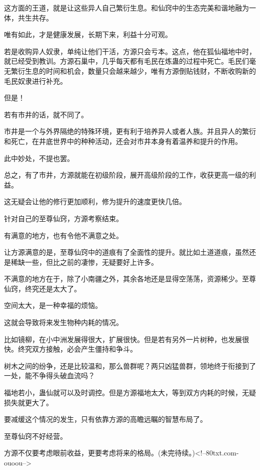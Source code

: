 \begin{this_body}
这方面的王道，就是让这些异人自己繁衍生息。和仙窍中的生态完美和谐地融为一体，共生共存。

唯有如此，才是健康发展，长期下来，利益十分可观。

若是收购异人奴隶，单纯让他们干活，方源只会亏本。这点，他在狐仙福地中时，就已经受到教训。方源石巢中，几乎每天都有毛民在炼蛊的过程中死亡。毛民们毫无繁衍生息的时间和机会，数量只会越来越少，唯有方源倒贴钱财，不断收购新的毛民奴隶进行补充。

但是！

若有市井的话，就不同了。

市井是一个与外界隔绝的特殊环境，更有利于培养异人或者人族。并且异人的繁衍和死亡，在井底世界中的种种活动，还会对市井本身有着温养和提升的作用。

此中妙处，不提也罢。

总之，有了市井，方源就能在初级阶段，展开高级阶段的工作，收获更高一级的利益。

这无疑会让他的修行更加顺利，修为提升的速度更快几倍。

针对自己的至尊仙窍，方源考察结束。

有满意的地方，也有令他不满意之处。

让方源满意的是，至尊仙窍中的道痕有了全面性的提升。就比如土道道痕，虽然还是稀缺一些，但比之前的凄惨，无疑要好上许多。

不满意的地方在于，除了小南疆之外，其余各地还是显得空荡荡，资源稀少。至尊仙窍，终究还是太大了。

空间太大，是一种幸福的烦恼。

这就会导致将来发生物种内耗的情况。

比如镜柳，在小中洲发展得很大，扩展很快。但是若有另外一片树种，也发展很快。终究双方接触，必会产生僵持和争斗。

树木之间的纷争，还是比较温和，那么兽群呢？两只凶猛兽群，领地终于衔接到了一处，能不争得头破血流吗？

福地若小，蛊仙就可以及时调控。但是方源福地太大，等到双方内耗的时候，无疑损失就更大了。

要减缓这个情况的发生，只有依靠方源的高瞻远瞩的智慧布局了。

至尊仙窍不好经营。

方源不仅要考虑眼前收益，更要考虑将来的格局。(未完待续。)<!--80txt.com-ouoou-->

\end{this_body}

